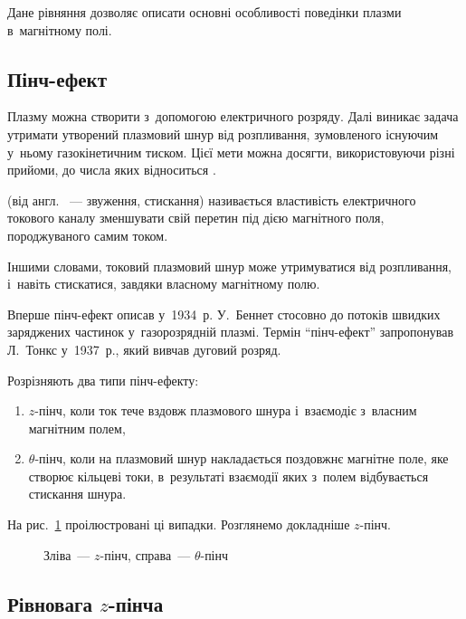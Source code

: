 Дане рівняння дозволяє описати основні особливості поведінки плазми в~магнітному полі.

\subsection{Пінч-ефект}

Плазму можна створити з~допомогою електричного розряду. Далі виникає задача утримати утворений плазмовий шнур від розпливання, зумовленого існуючим у~ньому газокінетичним тиском. Цієї мети можна досягти, використовуючи різні прийоми, до числа яких відноситься .

 (від англ. ~--- звуження, стискання) називається властивість електричного токового каналу зменшувати свій перетин під дією магнітного поля, породжуваного самим током.

Іншими словами, токовий плазмовий шнур може утримуватися від розпливання, і~навіть стискатися, завдяки власному магнітному полю.

Вперше пінч-ефект описав у~1934~р. У.~Беннет стосовно до потоків швидких заряджених частинок у~газорозрядній плазмі. Термін \enquote{пінч-ефект} запропонував Л.~Тонкс у~1937~р., який вивчав дуговий розряд.

Розрізняють два типи пінч-ефекту:
\begin{enumerate}
	\item $z$-пінч, коли ток тече вздовж плазмового шнура і~взаємодіє з~власним магнітним полем,
	\item $\theta$-пінч, коли на плазмовий шнур накладається поздовжнє магнітне поле, яке створює кільцеві токи, в~результаті взаємодії яких з~полем відбувається стискання шнура.
\end{enumerate}

На рис.~\ref{pic:pinch-types} проілюстровані ці випадки. Розглянемо докладніше $z$-пінч.

\begin{figure}[h!]\centering
	\caption{Зліва~--- $z$-пінч, справа~--- $\theta$-пінч}
	\label{pic:pinch-types}
\end{figure}

\subsection{Рівновага $z$-пінча}

